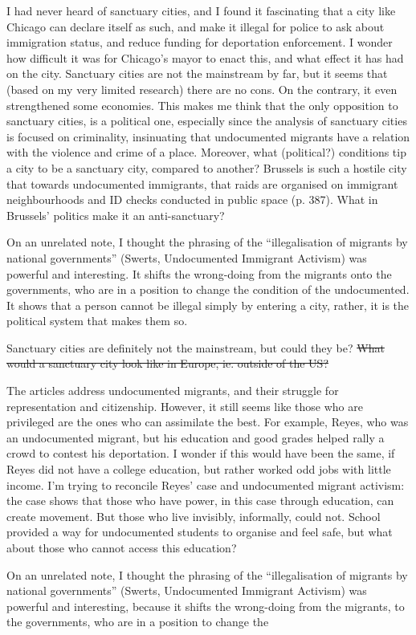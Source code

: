 \documentclass{article}
\begin{document}
\begin{outline}
	\1 I had never heard of sanctuary cities, and I found it fascinating that a city like Chicago can declare itself as such, and make it illegal for police to ask about immigration status, and reduce funding for deportation enforcement. I wonder how difficult it was for Chicago's mayor to enact this, and what effect it has had on the city. Sanctuary cities are not the mainstream by far, but it seems that (based on my very limited research) there are no cons. On the contrary, it even strengthened some economies. This makes me think that the only opposition to sanctuary cities, is a political one, especially since the analysis of sanctuary cities is focused on criminality, insinuating that undocumented migrants have a relation with the violence and crime of a place.
	 Moreover, what (political?) conditions tip a city to be a sanctuary city, compared to another? Brussels is such a hostile city that towards undocumented immigrants, that raids are organised on immigrant neighbourhoods and ID checks conducted in public space (p. 387). What in Brussels' politics make it an anti-sanctuary?
	 
	 On an unrelated note, I thought the phrasing of the ``illegalisation of migrants by national governments'' (Swerts, Undocumented Immigrant Activism) was powerful and interesting. It shifts the wrong-doing from the migrants onto the governments, who are in a position to change the condition of the undocumented. It shows that a person cannot be illegal simply by entering a city, rather, it is the political system that makes them so.
	

	Sanctuary cities are definitely not the mainstream, but could they be? 
	\sout{What would a sanctuary city look like in Europe, ie. outside of the US?}
	
	\1 The articles address undocumented migrants, and their struggle for representation and citizenship. However, it still seems like those who are privileged are the ones who can assimilate the best. For example, Reyes, who was an undocumented migrant, but his education and good grades helped rally a crowd to contest his deportation. I wonder if this would have been the same, if Reyes did not have a college education, but rather worked odd jobs with little income. I'm trying to reconcile Reyes' case and undocumented migrant activism: the case shows that those who have power, in this case through education, can create movement. But those who live invisibly, informally, could not. School provided a way for undocumented students to organise and feel safe, but what about those who cannot access this education? 
	
	\1 On an unrelated note, I thought the phrasing of the ``illegalisation of migrants by national governments'' (Swerts, Undocumented Immigrant Activism) was powerful and interesting, because it shifts the wrong-doing from the migrants, to the governments, who are in a position to change the  
	
\end{outline}
\end{document}
